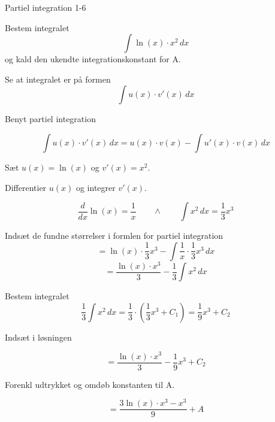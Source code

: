 \documentclass{article}
\begin{document}
\begin{exercise}{Partiel integration 1-6}


Bestem integralet
\[
\int \ln(x) \cdot x^2 \, dx
\]
og kald den ukendte integrationskonstant for A.



\hint

Se at integralet er på formen
\[
\int u(x) \cdot v'(x) \, dx
\]

\hint

Benyt partiel integration

\hint
\[
\int u(x) \cdot v'(x)\, dx = u(x) \cdot v(x) - \int u'(x) \cdot v(x) \, dx
\]
\hint

Sæt $u(x) = \ln(x)$ og $v'(x) = x^2$.


\hint

Differentier $u(x)$ og integrer $v'(x)$.

\hint
\[
\frac{d}{dx}\ln(x)= \frac{1}{x} \qquad \wedge \qquad \int x^2 \, dx = \frac{1}{3}x^3
\]

\hint

Indsæt de fundne størrelser i formlen for partiel integration
\[
= \ln(x) \cdot \frac{1}{3}x^3 - \int \frac{1}{x} \cdot \frac{1}{3}x^3 \, dx
\]
\[
= \frac{\ln(x) \cdot x^3}{3} - \frac{1}{3} \int x^2 \, dx
\]

\hint

Bestem integralet
\[
\frac{1}{3} \int x^2 \, dx = \frac{1}{3} \cdot \left( \frac{1}{3}x^3 + C_1 \right)= \frac{1}{9}x^3 + C_2
\]

\hint
Indsæt i løsningen

\hint

\[
= \frac{\ln(x) \cdot x^3}{3} - \frac{1}{9}x^3 + C_2
\]

\hint

Forenkl udtrykket og omdøb konstanten til A.

\hint

\[
= \frac{3\ln(x) \cdot x^3 - x^3}{9} + A
\]


\end{exercise}

\newpage
\end{document}
